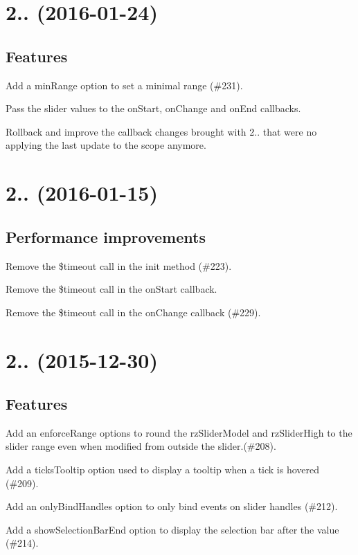\section*{2.. (2016-\/01-\/24)}

\subsection*{Features}


\begin{DoxyItemize}
\item Add a {\ttfamily min\+Range} option to set a minimal range (\#231).
\item Pass the slider values to the {\ttfamily on\+Start}, {\ttfamily on\+Change} and {\ttfamily on\+End} callbacks.
\item Rollback and improve the callback changes brought with 2.. that were no applying the last update to the scope anymore.
\end{DoxyItemize}

\section*{2.. (2016-\/01-\/15)}

\subsection*{Performance improvements}


\begin{DoxyItemize}
\item Remove the \$timeout call in the init method (\#223).
\item Remove the \$timeout call in the on\+Start callback.
\item Remove the \$timeout call in the on\+Change callback (\#229).
\end{DoxyItemize}

\section*{2.. (2015-\/12-\/30)}

\subsection*{Features}


\begin{DoxyItemize}
\item Add an {\ttfamily enforce\+Range} options to round the {\ttfamily rz\+Slider\+Model} and {\ttfamily rz\+Slider\+High} to the slider range even when modified from outside the slider.(\#208).
\item Add a {\ttfamily ticks\+Tooltip} option used to display a tooltip when a tick is hovered (\#209).
\item Add an {\ttfamily only\+Bind\+Handles} option to only bind events on slider handles (\#212).
\item Add a {\ttfamily show\+Selection\+Bar\+End} option to display the selection bar after the value (\#214).
\end{DoxyItemize}

